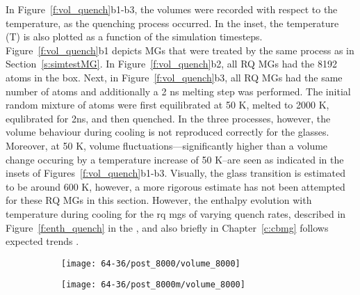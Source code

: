 In Figure~\ref{f:vol_quench}b1-b3, the volumes were recorded with respect to the temperature, as the quenching process occurred. In the inset, the temperature (T) is also plotted as a function of the simulation timesteps. Figure~\ref{f:vol_quench}b1 depicts MGs that were treated by the same process as in Section~\ref{s:simtestMG}. In Figure~\ref{f:vol_quench}b2, all RQ MGs had the 8192 atoms in the box. Next, in Figure~\ref{f:vol_quench}b3, all RQ MGs had the same number of atoms and additionally a 2 ns melting step was performed. The initial random mixture of atoms were first equilibrated at 50 K, melted to 2000 K, equlibrated for 2ns, and then quenched. In the three processes, however, the volume behaviour during cooling is not reproduced correctly for the glasses. Moreover, at 50 K, volume fluctuations---significantly higher than a volume change occuring by a temperature increase of 50 K--are seen as indicated in the insets of Figures~\ref{f:vol_quench}b1-b3. Visually, the glass transition is estimated to be around 600 K, however, a more rigorous estimate has not been attempted for these RQ MGs in this section. However, the enthalpy evolution with temperature during cooling for the \gls{rq} \gls{mg}s of varying quench rates, described in Figure~\ref{f:enth_quench} in the , and also briefly in Chapter~\ref{c:cbmg} follows expected trends \cite{Berthier2016,Ediger1996}. \par

\begin{figure}%
	\centering
	\begin{subfigure}{0.5\textwidth}
		\texttt{[image: 64-36/post\_8000/volume\_8000]}
		\caption{}
	\end{subfigure}%
	\begin{subfigure}{0.5\textwidth}
		\texttt{[image: 64-36/post\_8000m/volume\_8000]}
		\caption{}
	\end{subfigure}
	\label{f:vol_quench64}
\end{figure}

